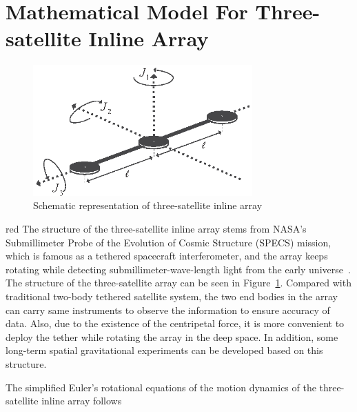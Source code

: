 \section{Mathematical Model For Three-satellite Inline Array}\label{sec:mm}
\begin{figure}
\centering
\includegraphics[width=0.75\textwidth]{paper2_Fig1.eps}
\caption{Schematic representation of three-satellite inline array}
\label{Figure:3satellite}
\end{figure}
\begin{color}{red} The structure of the three-satellite inline array stems from NASA's Submillimeter Probe of the Evolution of Cosmic Structure (SPECS) mission, which is famous as a tethered spacecraft interferometer, and the array keeps rotating while detecting submillimeter-wave-length light from the early universe~\cite{lorenzini2006far}. The structure of the three-satellite array can be seen in Figure~\ref{Figure:3satellite}. Compared with traditional two-body tethered satellite system, the two end bodies in the array can carry same instruments to observe the information to ensure accuracy of data. Also, due to the existence of the centripetal force, it is more convenient to deploy the tether while rotating the array in the deep space. In addition, some long-term spatial gravitational experiments can be developed based on this structure.\end{color}\par
The simplified Euler's rotational equations of the motion dynamics of the three-satellite inline array follows
